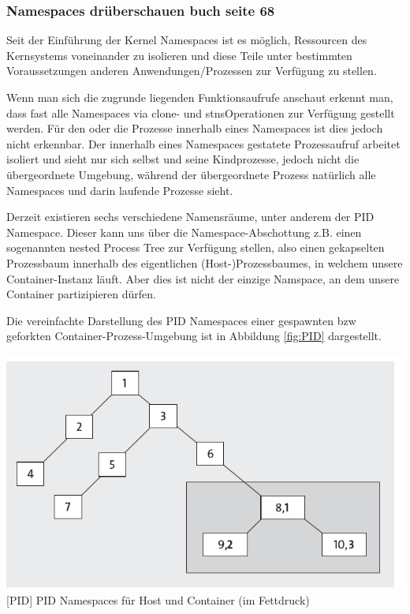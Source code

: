 \subsubsection{Namespaces drüberschauen buch seite 68}
Seit der Einführung der Kernel Namespaces ist es möglich, Ressourcen des Kernsystems  voneinander zu isolieren und diese Teile unter bestimmten Voraussetzungen anderen Anwendungen/Prozessen zur Verfügung zu stellen. 

Wenn man sich die zugrunde liegenden Funktionsaufrufe anschaut erkennt man, dass fast alle Namespaces via clone- und stnsOperationen zur Verfügung gestellt werden. Für den oder die Prozesse innerhalb eines Namespaces ist dies jedoch nicht erkennbar. Der innerhalb eines Namespaces gestatete Prozessaufruf arbeitet isoliert und sieht nur sich selbst und seine Kindprozesse, jedoch nicht die übergeordnete Umgebung, während der übergeordnete Prozess natürlich alle Namespaces und darin laufende Prozesse sieht. 

Derzeit existieren sechs verschiedene Namensräume, unter anderem der PID Namespace. Dieser kann uns über die Namespace-Abschottung z.B. einen sogenannten nested Process Tree zur Verfügung stellen, also einen gekapselten Prozessbaum innerhalb des eigentlichen (Host-)Prozessbaumes, in welchem unsere Container-Instanz läuft. Aber dies ist nicht der einzige Namspace, an dem unsere Container partizipieren dürfen.

Die vereinfachte Darstellung des PID Namespaces einer gespawnten bzw geforkten Container-Prozess-Umgebung ist in Abbildung \ref{fig:PID} dargestellt. \cite{Liebel2017SkalierbareContainer-Infrastrukturen}

\vspace{1em}
\begin{minipage}{\linewidth}
	\centering
	\includegraphics[width=1\linewidth]{pics/PID.PNG}
	[PID]{ PID Namespaces für Host und Container (im Fettdruck) \cite{Liebel2017SkalierbareContainer-Infrastrukturen}}
	\label{fig:PID}
\end{minipage}

